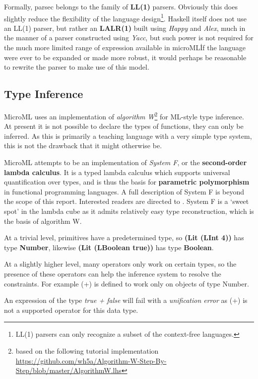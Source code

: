 \documentclass[12pt, a4paper]{report}
\begin{document}
Formally, parsec belongs to the family of \textbf{LL(1)} parsers. Obviously this does slightly reduce the
flexibility of the language design\footnote{LL(1) parsers can only recognize a subset of the
    context-free languages.}. Haskell itself does not use an LL(1) parser, but rather an
    \textbf{LALR(1)} built using \textit{Happy} and \textit{Alex}, much in the manner of a parser constructed using
\textit{Yacc}, but such power is not required for the much more limited range of expression
available in microML\. If the language were ever to be expanded or made more robust, it would perhaps
be reasonable to rewrite the parser to make use of this model.

\subsection{Type Inference}
\label{sec:type}
MicroML uses an implementation of
\textit{algorithm W}\footnote{based on the following tutorial implementation
    \url{https://github.com/wh5a/Algorithm-W-Step-By-Step/blob/master/AlgorithmW.lhs}} for ML-style type inference. At present it is
not possible to declare the types of functions, they can only be inferred. As this is primarily a
teaching language with a very simple type system, this is not the drawback that it might otherwise
be. 

MicroML attempts to be an implementation of \textit{System F}, or the \textbf{second-order lambda
calculus}. It is a typed lambda calculus which supports universal quantification over types, and is
thus the basis for \textbf{parametric polymorphism} in functional programming languages. A full
description of System F is beyond the scope of this report. Interested readers are directed to
\cite{Pierce:2002:TPL:509043}. System F is a `sweet spot' in the lambda cube as it admits relatively easy type
reconstruction, which is the basis of algorithm W.

At a trivial level, primitives have a predetermined type, so \textbf{(Lit (LInt 4))} has type
\textbf{Number}, likewise \textbf{(Lit (LBoolean true))} has type \textbf{Boolean}.

At a slightly higher level, many operators only work on certain types, so the presence of these
operators can help the inference system to resolve the constraints. For example 
(+) is defined to work only on objects of type Number.

An expression of the type \textit{true + false} will fail with a \textit{unification error} as (+)
is not a supported operator for this data type.
\end{document}
